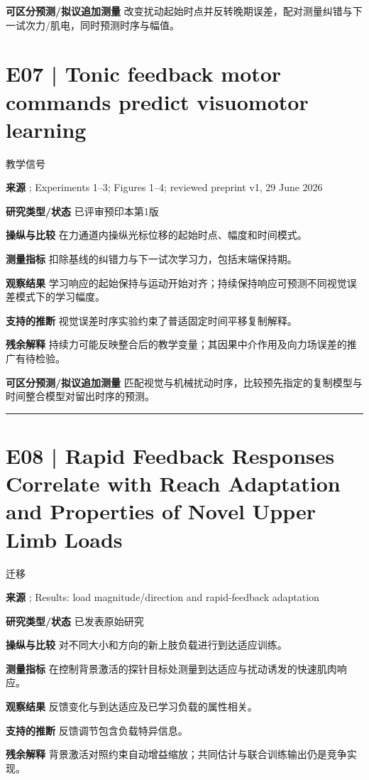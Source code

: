 \documentclass[11pt,a4paper]{article}
\begin{document}
\textbf{可区分预测/拟议追加测量} 改变扰动起始时点并反转晚期误差，配对测量纠错与下一试次力/肌电，同时预测时序与幅值。\par
\clearpage\section{E07 | Tonic feedback motor commands predict visuomotor learning}
{\small\sffamily\color{navy} 教学信号}\par
\textbf{来源} \cite{makino2026}; Experiments 1--3; Figures 1--4; reviewed preprint v1, 29 June 2026\par
\textbf{研究类型/状态} 已评审预印本第1版\par
\textbf{操纵与比较} 在力通道内操纵光标位移的起始时点、幅度和时间模式。\par
\textbf{测量指标} 扣除基线的纠错力与下一试次学习力，包括末端保持期。\par
\textbf{观察结果} 学习响应的起始保持与运动开始对齐；持续保持响应可预测不同视觉误差模式下的学习幅度。\par
\textbf{支持的推断} 视觉误差时序实验约束了普适固定时间平移复制解释。\par
\textbf{残余解释} 持续力可能反映整合后的教学变量；其因果中介作用及向力场误差的推广有待检验。\par
\textbf{可区分预测/拟议追加测量} 匹配视觉与机械扰动时序，比较预先指定的复制模型与时间整合模型对留出时序的预测。\par
\bigskip\hrule\medskip\section{E08 | Rapid Feedback Responses Correlate with Reach Adaptation and Properties of Novel Upper Limb Loads}
{\small\sffamily\color{navy} 迁移}\par
\textbf{来源} \cite{cluff2013}; Results: load magnitude/direction and rapid-feedback adaptation\par
\textbf{研究类型/状态} 已发表原始研究\par
\textbf{操纵与比较} 对不同大小和方向的新上肢负载进行到达适应训练。\par
\textbf{测量指标} 在控制背景激活的探针目标处测量到达适应与扰动诱发的快速肌肉响应。\par
\textbf{观察结果} 反馈变化与到达适应及已学习负载的属性相关。\par
\textbf{支持的推断} 反馈调节包含负载特异信息。\par
\textbf{残余解释} 背景激活对照约束自动增益缩放；共同估计与联合训练输出仍是竞争实现。\par
\end{document}

